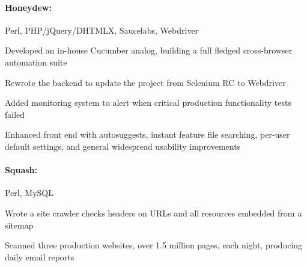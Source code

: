 \begin{position}


  \paragraph{Honeydew:} Perl, PHP/jQuery/DHTMLX, Saucelabs, Webdriver
  \begin{myitem}
  \item Developed an in-house Cucumber analog, building a full fledged cross-browser automation suite
  \item Rewrote the backend to update the project from Selenium RC to Webdriver
  \item Added monitoring system to alert when critical production functionality tests failed
  \item Enhanced front end with autosuggests, instant feature file searching, per-user default
    settings, and general widespread usability improvements
  \end{myitem}
%
%
  \paragraph{Squash:} Perl, MySQL
  \begin{myitem}
  \item Wrote a site crawler checks headers on URLs and all resources embedded from a sitemap
  \item Scanned three production websites, over 1.5 million pages,
    each night, producing daily email reports
  \end{myitem}
%

\end{position}
